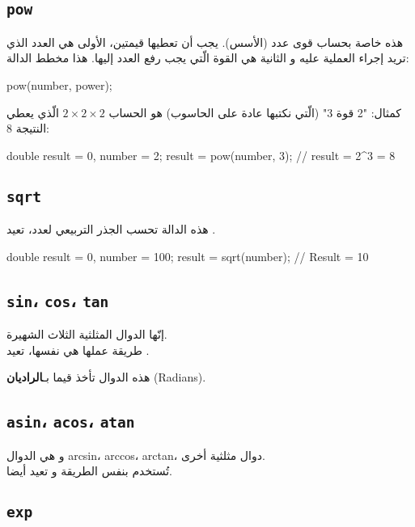 \subsection{\texttt{pow}}

هذه خاصة بحساب قوى عدد (الأسس). يجب أن تعطيها قيمتين، الأولى هي العدد الذي تريد إجراء العملية عليه و الثانية هي القوة الّتي يجب رفع العدد إليها. هذا مخطط الدالة:

\begin{Csource}
pow(number, power);
\end{Csource}

كمثال: "2 قوة 3" (الّتي نكتبها عادة
على الحاسوب) هو الحساب
$ 2 \times 2 \times 2 $
الّذي يعطي النتيجة 8:

\begin{Csource}
double result = 0, number = 2;
result = pow(number, 3); // result = 2^3 = 8
\end{Csource}

\subsection{\texttt{sqrt}}

هذه الدالة تحسب الجذر التربيعي لعدد، تعيد
.

\begin{Csource}
double result = 0, number = 100;
result = sqrt(number); // Result = 10
\end{Csource}

\subsection{\texttt{sin}، \texttt{cos}، \texttt{tan}}

إنّها الدوال المثلثية الثلاث الشهيرة.\\
طريقة عملها هي نفسها، تعيد
.

هذه الدوال تأخذ قيما بـ\textbf{الراديان}
(\textenglish{Radians}).

\subsection{\texttt{asin}، \texttt{acos}، \texttt{atan}}

و هي الدوال
\textenglish{arcsin}، \textenglish{arccos}، \textenglish{arctan}،
دوال مثلثية أخرى.\\
تُستخدم بنفس الطريقة و تعيد
أيضا.

\subsection{\texttt{exp}}

